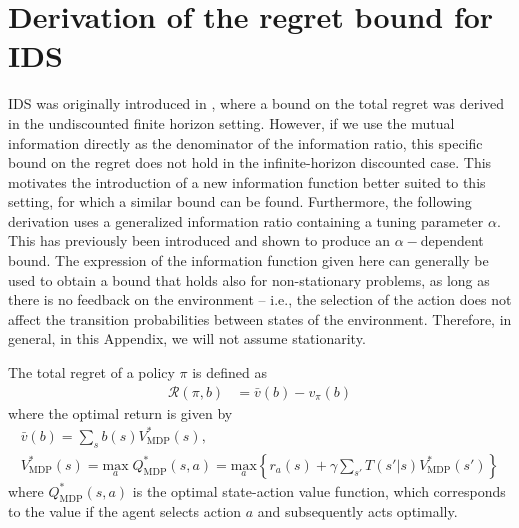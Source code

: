 \documentclass[aps,nofootinbib,groupaddress,superscriptaddress,reprint,amsmath,amssymb,graphicx,onecolumn,prx]{revtex4-2}
\begin{document}
\section{Derivation of the regret bound for IDS}
\label{app:ids_bounds}
\noindent IDS was originally introduced in \cite{russo2014learning}, where a bound on the total regret was derived in the undiscounted finite horizon setting. However, if we use the mutual information directly as the denominator of the information ratio, this specific bound on the regret does not hold in the infinite-horizon discounted case. This motivates the introduction of a new information function better suited to this setting, for which a similar bound can be found. Furthermore, the following derivation uses a generalized information ratio containing a tuning parameter $\alpha$. This has previously been introduced \cite{lattimore2021mirror} and shown to produce an $\alpha-$dependent bound. The expression of the information function given here can generally be used to obtain a bound that holds also for non-stationary problems, as long as there is no feedback on the environment -- i.e., the selection of the action does not affect the transition probabilities between states of the environment. Therefore, in general, in this Appendix, we will not assume stationarity.

The total regret of a policy $\pi$ is defined as 
\begin{align}            
\mathcal{R}(\pi,b)&=\bar{v}(b)-v_\pi(b)
\end{align}
where the optimal return is given by
\begin{gather}
    \bar{v}(b) =\sum_s b(s) V_{\mathrm{MDP}}^*(s), \\
    V_{\mathrm{MDP}}^*(s)=\underset{a}{\text{max}} \;Q_{\mathrm{MDP}}^*(s,a)=\underset{a}{\text{max}}\left\{r_a(s)+\gamma\sum_{s'}T(s'|s)V_{\mathrm{MDP}}^*(s')\right\}
\end{gather}
where $Q_{\mathrm{MDP}}^*(s,a)$ is the optimal state-action value function, which corresponds to the value if the agent selects action $a$ and subsequently acts optimally. 
\end{document}
